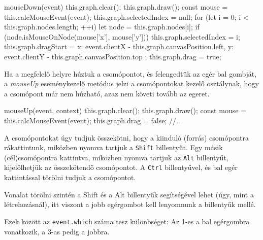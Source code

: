\begin{javascript}
mouseDown(event)
{
   this.graph.clear();
   this.graph.draw();
   const mouse = this.calcMouseEvent(event);
   this.graph.selectedIndex = null;
   for (let i = 0; i < this.graph.nodes.length; ++i) {
       let node = this.graph.nodes[i];
       if (node.isMouseOnNode(mouse['x'], mouse['y'])){
           this.graph.selectedIndex = i;
       }
   }
   this.graph.dragStart = {
       x: event.clientX - this.graph.canvasPosition.left,
       y: event.clientY - this.graph.canvasPosition.top
   };
   this.graph.drag = true;
}
\end{javascript}

Ha a megfelelő helyre húztuk a csomópontot, és felengedtük az egér bal gombját, a \textit{mouseUp} eseménykezelő metódus jelzi a csomópontokat kezelő osztálynak, hogy a csomópont már nem húzható, azaz nem követi tovább az egeret.

\begin{javascript}
mouseUp(event, context)
{
   this.graph.clear();
   this.graph.draw();
   const mouse = this.calcMouseEvent(event);
   this.graph.drag = false;
   //...
}
\end{javascript}

A csomópontokat úgy tudjuk összekötni, hogy a kiinduló (forrás) csomópontra rákattintunk, miközben nyomva tartjuk a \texttt{Shift} billentyűt. Egy másik (cél)csomópontra kattintva, miközben nyomva tartjuk az \texttt{Alt} billentyűt, kijelölhetjük az összekötendő csomópontot. A \texttt{Ctrl} billentyűvel, és bal egér kattintással törölni tudjuk a csomópontot.

Vonalat törölni szintén a Shift és a Alt billentyűk segítségével lehet (úgy, mint a létrehozásnál), itt viszont a jobb egérgombot kell lenyomnunk a billentyűk mellé.

Ezek között az \texttt{event.which} száma tesz különbséget: Az 1-es a bal egérgombra vonatkozik, a 3-as pedig a jobbra.

